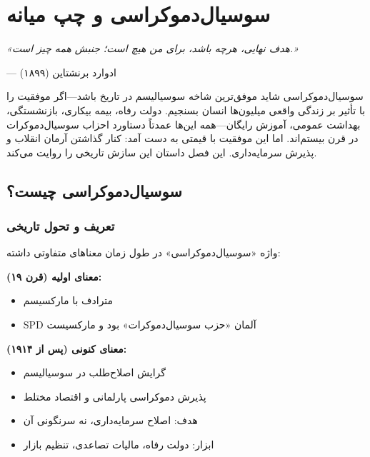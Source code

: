 
\chapter{سوسیال‌دموکراسی و چپ میانه}
\label{ch:social-democracy}

\begin{flushright}
\textit{«هدف نهایی، هرچه باشد، برای من هیچ است؛ جنبش همه چیز است.»}

— ادوارد برنشتاین (۱۸۹۹)
\end{flushright}


\lettrine[lines=3, lraise=0.1, nindent=0.5em]{\textcolor{CenterGreen}{س}}{وسیال‌دموکراسی} 
شاید موفق‌ترین شاخه سوسیالیسم در تاریخ باشد—اگر موفقیت را با تأثیر بر زندگی واقعی میلیون‌ها انسان بسنجیم. دولت رفاه، بیمه بیکاری، بازنشستگی، بهداشت عمومی، آموزش رایگان—همه این‌ها عمدتاً دستاورد احزاب سوسیال‌دموکرات در قرن بیستم‌اند. اما این موفقیت با قیمتی به دست آمد: کنار گذاشتن آرمان انقلاب و پذیرش سرمایه‌داری. این فصل داستان این سازش تاریخی را روایت می‌کند.

\section{سوسیال‌دموکراسی چیست؟}

\subsection{تعریف و تحول تاریخی}

\begin{defbox}
واژه «سوسیال‌دموکراسی» در طول زمان معناهای متفاوتی داشته:

\textbf{معنای اولیه (قرن ۱۹):}
\begin{itemize}[nosep]
    \item مترادف با مارکسیسم
    \item SPD آلمان «حزب سوسیال‌دموکرات» بود و مارکسیست
\end{itemize}

\textbf{معنای کنونی (پس از ۱۹۱۴):}
\begin{itemize}[nosep]
    \item گرایش اصلاح‌طلب در سوسیالیسم
    \item پذیرش دموکراسی پارلمانی و اقتصاد مختلط
    \item هدف: اصلاح سرمایه‌داری، نه سرنگونی آن
    \item ابزار: دولت رفاه، مالیات تصاعدی، تنظیم بازار
\end{itemize}
\end{defbox}

